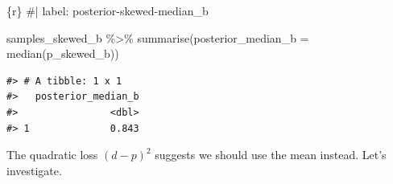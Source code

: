 \documentclass[
  letterpaper,
  DIV=11,
  numbers=noendperiod]{scrreprt}
\newenvironment{Shaded}{\begin{snugshade}}{\end{snugshade}}
\newcommand{\AttributeTok}[1]{\textcolor[rgb]{0.40,0.45,0.13}{#1}}
\newcommand{\CommentTok}[1]{\textcolor[rgb]{0.37,0.37,0.37}{#1}}
\newcommand{\FunctionTok}[1]{\textcolor[rgb]{0.28,0.35,0.67}{#1}}
\newcommand{\InformationTok}[1]{\textcolor[rgb]{0.37,0.37,0.37}{#1}}
\newcommand{\NormalTok}[1]{\textcolor[rgb]{0.00,0.23,0.31}{#1}}
\newcommand{\SpecialCharTok}[1]{\textcolor[rgb]{0.37,0.37,0.37}{#1}}
\begin{document}
\begin{Shaded}
\begin{Highlighting}[]
\InformationTok{\textasciigrave{}\textasciigrave{}\textasciigrave{}\{r\}}
\CommentTok{\#| label: posterior{-}skewed{-}median\_b}

\NormalTok{samples\_skewed\_b }\SpecialCharTok{\%\textgreater{}\%} 
  \FunctionTok{summarise}\NormalTok{(}\AttributeTok{posterior\_median\_b =} \FunctionTok{median}\NormalTok{(p\_skewed\_b))}
\InformationTok{\textasciigrave{}\textasciigrave{}\textasciigrave{}}
\end{Highlighting}
\end{Shaded}

\begin{verbatim}
#> # A tibble: 1 x 1
#>   posterior_median_b
#>                <dbl>
#> 1              0.843
\end{verbatim}

The quadratic loss \((d−p)^{2}\) suggests we should use the mean
instead. Let's investigate.
\end{document}
